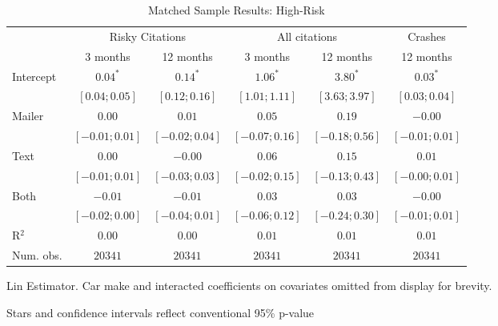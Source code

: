 
\begin{table}
\caption{Matched Sample Results: High-Risk}
\begin{center}
\begin{threeparttable}
\begin{tabular}{l c c c c c}
\hline
 & \multicolumn{2}{c}{Risky Citations} & \multicolumn{2}{c}{All citations} & \multicolumn{1}{c}{Crashes} \\
\cline{2-3} \cline{4-5} \cline{6-6}
 & 3 months & 12 months & 3 months & 12 months & 12 months \\
\hline
Intercept & $0.04^{*}$       & $0.14^{*}$       & $1.06^{*}$       & $3.80^{*}$       & $0.03^{*}$       \\
          & $ [ 0.04; 0.05]$ & $ [ 0.12; 0.16]$ & $ [ 1.01; 1.11]$ & $ [ 3.63; 3.97]$ & $ [ 0.03; 0.04]$ \\
Mailer    & $0.00$           & $0.01$           & $0.05$           & $0.19$           & $-0.00$          \\
          & $ [-0.01; 0.01]$ & $ [-0.02; 0.04]$ & $ [-0.07; 0.16]$ & $ [-0.18; 0.56]$ & $ [-0.01; 0.01]$ \\
Text      & $0.00$           & $-0.00$          & $0.06$           & $0.15$           & $0.01$           \\
          & $ [-0.01; 0.01]$ & $ [-0.03; 0.03]$ & $ [-0.02; 0.15]$ & $ [-0.13; 0.43]$ & $ [-0.00; 0.01]$ \\
Both      & $-0.01$          & $-0.01$          & $0.03$           & $0.03$           & $-0.00$          \\
          & $ [-0.02; 0.00]$ & $ [-0.04; 0.01]$ & $ [-0.06; 0.12]$ & $ [-0.24; 0.30]$ & $ [-0.01; 0.01]$ \\
\hline
R$^2$     & $0.00$           & $0.00$           & $0.01$           & $0.01$           & $0.01$           \\
Num. obs. & $20341$          & $20341$          & $20341$          & $20341$          & $20341$          \\
\hline
\end{tabular}
\begin{tablenotes}[flushleft]
\scriptsize{\item Lin Estimator. Car make and interacted coefficients on covariates omitted from display for brevity.
                             \item Stars and confidence intervals reflect conventional 95\% p-value}
\end{tablenotes}
\end{threeparttable}
\label{table:coefficients}
\end{center}
\end{table}
